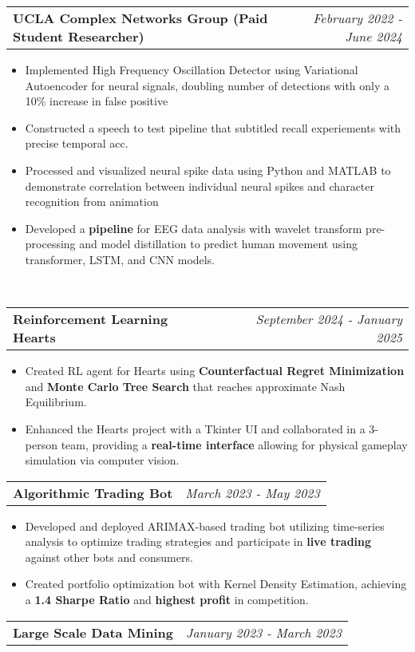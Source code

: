 \documentclass[letterpaper,11pt]{article}
\makeatletter
\newcommand{\resitem}[1]{\item #1 \vspace{-8pt}}
\newcommand{\resheading}[1]{\vspace{8pt}{\Large \textbf{#1}}\\\vspace{-8pt}\hrulefill}
\newcommand{\ressubheadingsmol}[2]{\vspace{1pt}
\begin{tabular*}{7.0in}{l@{\cftdotfill{\cftsecdotsep}\extracolsep{\fill}}r}
		\textbf{#1} & \textit{#2} \\
\end{tabular*}\vspace{-6pt}}
\makeatother
\begin{document}
\ressubheadingsmol{UCLA Complex Networks Group (Paid Student Researcher)}{February 2022 - June 2024}
\begin{itemize}
    \resitem{Implemented High Frequency Oscillation Detector using Variational Autoencoder for neural signals, doubling number of detections with only a 10\% increase in false positive}
    \resitem{Constructed a speech to test pipeline that subtitled recall experiements with precise temporal acc.}
    \resitem{Processed and visualized neural spike data using Python and MATLAB to demonstrate correlation between individual neural spikes and character recognition from animation}
    \resitem{Developed a \textbf{pipeline} for EEG data analysis with wavelet transform pre-processing and model distillation to predict human movement using transformer, LSTM, and CNN models.}

\end{itemize}


\resheading{Projects}
\ressubheadingsmol{Reinforcement Learning Hearts}{September 2024 - January 2025}
\begin{itemize}
    \resitem{Created RL agent for Hearts using \textbf{Counterfactual Regret Minimization} and \textbf{Monte Carlo Tree Search} that reaches approximate Nash Equilibrium.}
    \resitem{Enhanced the Hearts project with a Tkinter UI and collaborated in a 3-person team, providing a \textbf{real-time interface} allowing for physical gameplay simulation via computer vision.}
\end{itemize}

\ressubheadingsmol{Algorithmic Trading Bot}{March 2023 - May 2023}
\begin{itemize}
    \resitem{Developed and deployed ARIMAX-based trading bot utilizing time-series analysis to optimize trading strategies and participate in \textbf{live trading} against other bots and consumers.}
    \resitem{Created portfolio optimization bot with Kernel Density Estimation, achieving a \textbf{1.4 Sharpe Ratio} and \textbf{highest profit} in competition.}
\end{itemize}
\ressubheadingsmol{Large Scale Data Mining}{January 2023 - March 2023}
\end{document}
